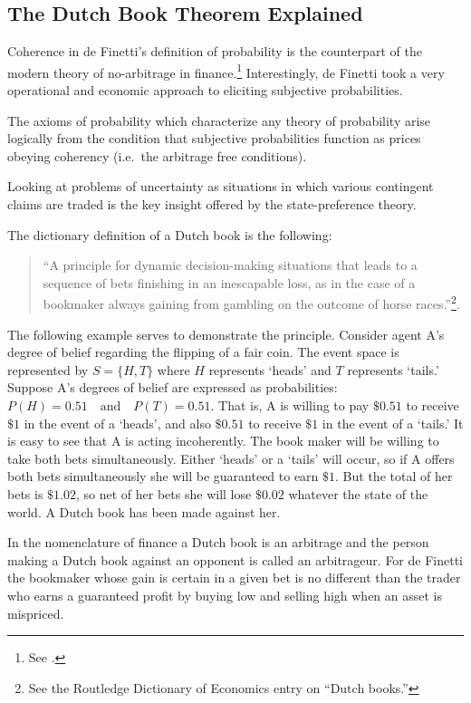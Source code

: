 \documentclass[11pt,]{article}
\begin{document}
\subsection{The Dutch Book Theorem
Explained}\label{the-dutch-book-theorem-explained}

Coherence in de Finetti's definition of probability is the counterpart
of the modern theory of no-arbitrage in finance.\footnote{See
  \citet{PressaccoZiani2010}.} Interestingly, de Finetti took a very
operational and economic approach to eliciting subjective probabilities.

The axioms of probability which characterize any theory of probability
arise logically from the condition that subjective probabilities
function as prices obeying coherency (i.e.~the arbitrage free
conditions).

Looking at problems of uncertainty as situations in which various
contingent claims are traded is the key insight offered by the
state-preference theory.

The dictionary definition of a Dutch book is the following:

\begin{quote}
``A principle for dynamic decision-making situations that leads to a
sequence of bets finishing in an inescapable loss, as in the case of a
bookmaker always gaining from gambling on the outcome of horse
races.''\footnote{See the Routledge Dictionary of Economics entry on
  ``Dutch books.''}.
\end{quote}

The following example serves to demonstrate the principle. Consider
agent A's degree of belief regarding the flipping of a fair coin. The
event space is represented by \(S = \{H, T\}\) where \(H\) represents
`heads' and \(T\) represents `tails.' Suppose A's degrees of belief are
expressed as probabilities:
\(P(H) = 0.51 \quad \mbox{and} \quad P(T) = 0.51\). That is, A is
willing to pay \(\$0.51\) to receive \(\$1\) in the event of a `heads',
and also \(\$0.51\) to receive \(\$1\) in the event of a `tails.' It is
easy to see that A is acting incoherently. The book maker will be
willing to take both bets simultaneously. Either `heads' or a `tails'
will occur, so if A offers both bets simultaneously she will be
guaranteed to earn \(\$1\). But the total of her bets is \(\$1.02\), so
net of her bets she will lose \(\$0.02\) whatever the state of the
world. A Dutch book has been made against her.

In the nomenclature of finance a Dutch book is an arbitrage and the
person making a Dutch book against an opponent is called an arbitrageur.
For de Finetti the bookmaker whose gain is certain in a given bet is no
different than the trader who earns a guaranteed profit by buying low
and selling high when an asset is mispriced.
\end{document}
